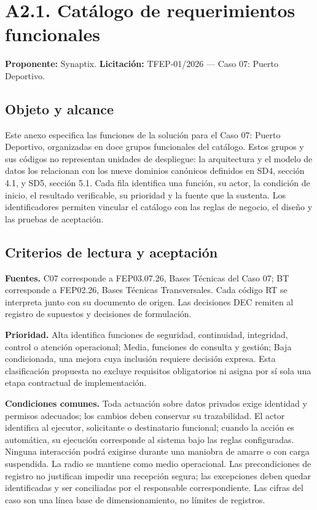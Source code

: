 \section*{A2.1. Catálogo de requerimientos funcionales}
\textbf{Proponente:} Synaptix. \quad
\textbf{Licitación:} TFEP-01/2026 — Caso 07: Puerto Deportivo.

\subsection*{Objeto y alcance}
Este anexo especifica las funciones de la solución para el Caso 07: Puerto
Deportivo, organizadas en doce grupos funcionales del catálogo. Estos grupos
y sus códigos no representan unidades de despliegue: la arquitectura y el
modelo de datos los relacionan con los nueve dominios canónicos definidos en
SD4, sección 4.1, y SD5, sección 5.1. Cada fila identifica una función,
su actor, la condición de inicio, el resultado verificable, su prioridad y
la fuente que la sustenta. Los identificadores permiten vincular el catálogo
con las reglas de negocio, el diseño y las pruebas de aceptación.

\subsection*{Criterios de lectura y aceptación}
\textbf{Fuentes.} C07 corresponde a FEP03.07.26, Bases Técnicas del Caso 07;
BT corresponde a FEP02.26, Bases Técnicas Transversales. Cada código RT se
interpreta junto con su documento de origen. Las decisiones DEC remiten al
registro de supuestos y decisiones de formulación.

\textbf{Prioridad.} Alta identifica funciones de seguridad, continuidad,
integridad, control o atención operacional; Media, funciones de consulta y
gestión; Baja condicionada, una mejora cuya inclusión requiere decisión expresa.
Esta clasificación propuesta no excluye requisitos obligatorios ni asigna
por sí sola una etapa contractual de implementación.

\textbf{Condiciones comunes.} Toda actuación sobre datos privados exige
identidad y permisos adecuados; los cambios deben conservar su trazabilidad.
El actor identifica al ejecutor, solicitante o destinatario funcional; cuando
la acción es automática, su ejecución corresponde al sistema bajo las reglas configuradas.
Ninguna interacción podrá exigirse durante una maniobra de amarre o con carga
suspendida. La radio se mantiene como medio operacional. Las precondiciones
de registro no justifican impedir una recepción segura; las excepciones deben
quedar identificadas y ser conciliadas por el responsable correspondiente.
Las cifras del caso son una línea base de dimensionamiento, no límites de registros.

